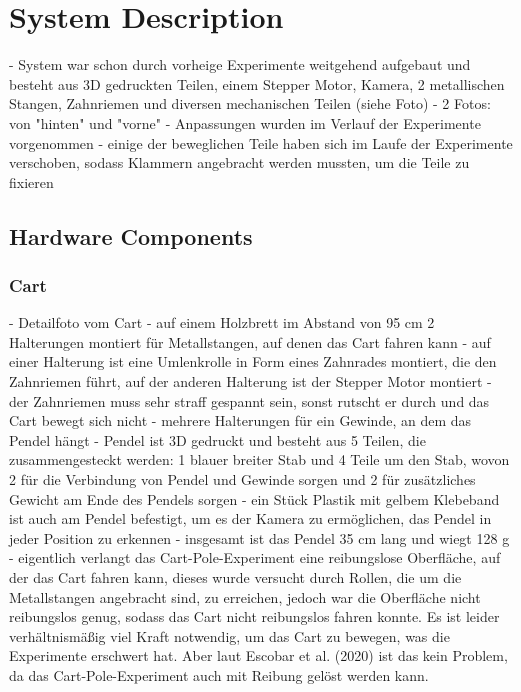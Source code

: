 \chapter{System Description}

- System war schon durch vorheige Experimente weitgehend aufgebaut und besteht aus 3D gedruckten Teilen, einem Stepper Motor, Kamera, 2 metallischen Stangen, Zahnriemen und diversen mechanischen Teilen (siehe Foto)
- 2 Fotos: von "hinten" und "vorne"
- Anpassungen wurden im Verlauf der Experimente vorgenommen
- einige der beweglichen Teile haben sich im Laufe der Experimente verschoben, sodass Klammern angebracht werden mussten, um die Teile zu fixieren

\section{Hardware Components}
\subsection{Cart}
- Detailfoto vom Cart
- auf einem Holzbrett im Abstand von 95 cm 2 Halterungen montiert für Metallstangen, auf denen das Cart fahren kann
- auf einer Halterung ist eine Umlenkrolle in Form eines Zahnrades montiert, die den Zahnriemen führt, auf der anderen Halterung ist der Stepper Motor montiert
- der Zahnriemen muss sehr straff gespannt sein, sonst rutscht er durch und das Cart bewegt sich nicht
- mehrere Halterungen für ein Gewinde, an dem das Pendel hängt
- Pendel ist 3D gedruckt und besteht aus 5 Teilen, die zusammengesteckt werden: 1 blauer breiter Stab und 4 Teile um den Stab, wovon 2 für die Verbindung von Pendel und Gewinde sorgen und 2 für zusätzliches Gewicht am Ende des Pendels sorgen
- ein Stück Plastik mit gelbem Klebeband ist auch am Pendel befestigt, um es der Kamera zu ermöglichen, das Pendel in jeder Position zu erkennen
- insgesamt ist das Pendel 35 cm lang und wiegt 128 g
- eigentlich verlangt das Cart-Pole-Experiment eine reibungslose Oberfläche, auf der das Cart fahren kann, dieses wurde versucht durch Rollen, die um die Metallstangen angebracht sind, zu erreichen, jedoch war die Oberfläche nicht reibungslos genug, sodass das Cart nicht reibungslos fahren konnte. Es ist leider verhältnismäßig viel Kraft notwendig, um das Cart zu bewegen, was die Experimente erschwert hat. Aber laut Escobar et al. (2020) ist das kein Problem, da das Cart-Pole-Experiment auch mit Reibung gelöst werden kann.

